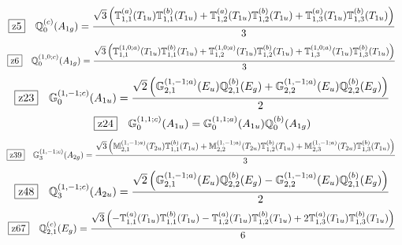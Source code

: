\documentclass[fleqn,10pt,landscape]{jsarticle}
\begin{document}
\begin{dmath*}
\hspace*{3mm}\fbox{z5}\quad \mathbb{Q}_{0}^{(c)}(A_{1g})=\frac{\sqrt{3} \left(\mathbb{T}_{1,1}^{(a)}(T_{1u}) \mathbb{T}_{1,1}^{(b)}(T_{1u}) + \mathbb{T}_{1,2}^{(a)}(T_{1u}) \mathbb{T}_{1,2}^{(b)}(T_{1u}) + \mathbb{T}_{1,3}^{(a)}(T_{1u}) \mathbb{T}_{1,3}^{(b)}(T_{1u})\right)}{3}
\end{dmath*}
\begin{dmath*}
\hspace*{3mm}\fbox{z6}\quad \mathbb{Q}_{0}^{(1,0;c)}(A_{1g})=\frac{\sqrt{3} \left(\mathbb{T}_{1,1}^{(1,0;a)}(T_{1u}) \mathbb{T}_{1,1}^{(b)}(T_{1u}) + \mathbb{T}_{1,2}^{(1,0;a)}(T_{1u}) \mathbb{T}_{1,2}^{(b)}(T_{1u}) + \mathbb{T}_{1,3}^{(1,0;a)}(T_{1u}) \mathbb{T}_{1,3}^{(b)}(T_{1u})\right)}{3}
\end{dmath*}
\begin{dmath*}
\hspace*{3mm}\fbox{z23}\quad \mathbb{G}_{0}^{(1,-1;c)}(A_{1u})=\frac{\sqrt{2} \left(\mathbb{G}_{2,1}^{(1,-1;a)}(E_{u}) \mathbb{Q}_{2,1}^{(b)}(E_{g}) + \mathbb{G}_{2,2}^{(1,-1;a)}(E_{u}) \mathbb{Q}_{2,2}^{(b)}(E_{g})\right)}{2}
\end{dmath*}
\begin{dmath*}
\hspace*{3mm}\fbox{z24}\quad \mathbb{G}_{0}^{(1,1;c)}(A_{1u})=\mathbb{G}_{0}^{(1,1;a)}(A_{1u}) \mathbb{Q}_{0}^{(b)}(A_{1g})
\end{dmath*}
\begin{dmath*}
\hspace*{3mm}\fbox{z39}\quad \mathbb{G}_{3}^{(1,-1;c)}(A_{2g})=\frac{\sqrt{3} \left(\mathbb{M}_{2,1}^{(1,-1;a)}(T_{2u}) \mathbb{T}_{1,1}^{(b)}(T_{1u}) + \mathbb{M}_{2,2}^{(1,-1;a)}(T_{2u}) \mathbb{T}_{1,2}^{(b)}(T_{1u}) + \mathbb{M}_{2,3}^{(1,-1;a)}(T_{2u}) \mathbb{T}_{1,3}^{(b)}(T_{1u})\right)}{3}
\end{dmath*}
\begin{dmath*}
\hspace*{3mm}\fbox{z48}\quad \mathbb{Q}_{3}^{(1,-1;c)}(A_{2u})=\frac{\sqrt{2} \left(\mathbb{G}_{2,1}^{(1,-1;a)}(E_{u}) \mathbb{Q}_{2,2}^{(b)}(E_{g}) - \mathbb{G}_{2,2}^{(1,-1;a)}(E_{u}) \mathbb{Q}_{2,1}^{(b)}(E_{g})\right)}{2}
\end{dmath*}
\begin{dmath*}
\hspace*{3mm}\fbox{z67}\quad \mathbb{Q}_{2,1}^{(c)}(E_{g})=\frac{\sqrt{3} \left(- \mathbb{T}_{1,1}^{(a)}(T_{1u}) \mathbb{T}_{1,1}^{(b)}(T_{1u}) - \mathbb{T}_{1,2}^{(a)}(T_{1u}) \mathbb{T}_{1,2}^{(b)}(T_{1u}) + 2 \mathbb{T}_{1,3}^{(a)}(T_{1u}) \mathbb{T}_{1,3}^{(b)}(T_{1u})\right)}{6}
\end{dmath*}
\end{document}
